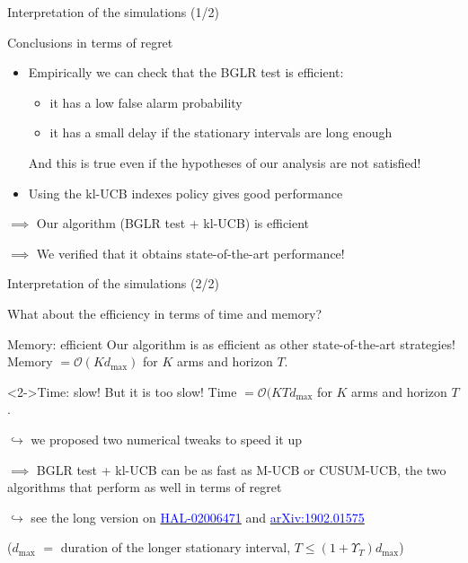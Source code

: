 \documentclass[11pt,english,ignorenonframetext,]{beamer}
\providecommand{\tightlist}{%
  \setlength{\itemsep}{0pt}\setlength{\parskip}{0pt}}
\begin{document}
\begin{frame}{Interpretation of the simulations (1/2)}

  \begin{block}{Conclusions in terms of regret}
    \begin{itemize}
      \item
      Empirically we can check that the \alert{BGLR test is efficient}:
      \begin{itemize}\tightlist
        \item
        it has a \alert{low false alarm probability}
        \item
        it has a \alert{small delay} if the stationary intervals are long enough
      \end{itemize}
      And this is true even if the hypotheses of our analysis are not satisfied!
      \item
      Using the kl-UCB indexes policy gives good performance
    \end{itemize}
    $\implies$ Our algorithm (BGLR test + kl-UCB) is efficient

    $\implies$ We verified that it obtains state-of-the-art performance!
  \end{block}

\end{frame}


\begin{frame}{Interpretation of the simulations (2/2)}

  What about the efficiency in terms of time and memory?

  \begin{block}{Memory: efficient}
    Our algorithm is as efficient as other state-of-the-art strategies!\\
    Memory $= \mathcal{O}(K d_{\max})$
    for $K$ arms and horizon $T$.
  \end{block}

  \begin{alertblock}<2->{Time: slow!}
    But it is too slow!
    Time $= \mathcal{O}(K T d_{\max}$
    for $K$ arms and horizon $T$.

    $\hookrightarrow$ we proposed two numerical tweaks to speed it up

    $\implies$ BGLR test + kl-UCB can be as fast as M-UCB or CUSUM-UCB, the two algorithms that perform as well in terms of regret

    $\hookrightarrow$  see the long version on \href{https://hal.inria.fr/hal-02006471}{\textcolor{blue}{HAL-02006471}} and \href{https://arxiv.org/abs/1902.01575}{\textcolor{blue}{arXiv:1902.01575}}
  \end{alertblock}

  ($d_{\max}$ $=$ duration of the longer stationary interval, $T \leq (1+\Upsilon_T) d_{\max}$)

\end{frame}
\end{document}
